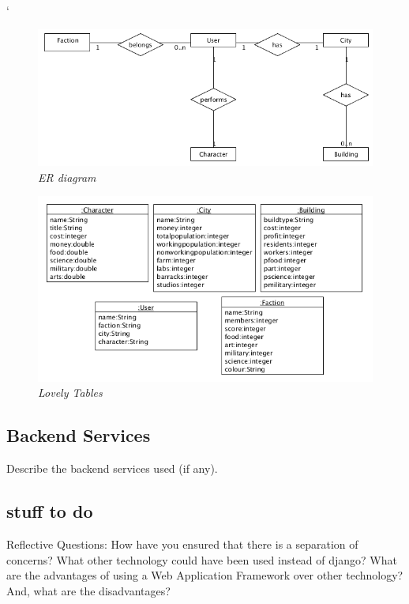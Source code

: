 `\documentclass{sig-alt-release2}
\begin{document}
\begin{figure}[!htbp]
  \caption{\textit{ER diagram}}
  \begin{center}
		\includegraphics[scale=0.40]{img/er.png}
  \end{center}
\end{figure}

\begin{figure}[!htbp]
  \caption{\textit{Lovely Tables}}
  \begin{center}
		\includegraphics[scale=0.40]{img/tables.png}
  \end{center}
\end{figure}

\subsection{Backend Services}

Describe the backend services used (if any).

\subsection{stuff to do} 

Reflective Questions: 
How have you ensured that there is a separation of concerns? 
What other technology could have been used instead of django? 
What are the advantages of using a Web Application Framework over other technology? 
And, what are the disadvantages?
\end{document}
